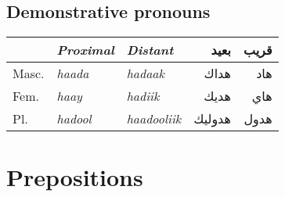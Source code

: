 \documentclass[oneside,a4paper]{article}
\newcommand{\page}[1]{\marginnote{\normalsize{\upshape(#1)}}}
\begin{document}
\subsection{Demonstrative pronouns} \page{552}

\begin{tabular}{l>{\itshape}l>{\itshape}lrr}
\toprule

                   & \upshape Proximal & \upshape Distant & \textarabic{بعيد}   & \textarabic{قريب} \\
  \midrule
  Masc.            & haada             & hadaak           & \textarabic{هداك}   & \textarabic{هاد}\\
  Fem.             & haay              & hadiik           & \textarabic{هديك}   & \textarabic{هاي} \\
  Pl.              & hadool            & haadooliik       & \textarabic{هدوليك} & \textarabic{هدول} \\

  \bottomrule
\end{tabular}


\section{Prepositions}
\end{document}
